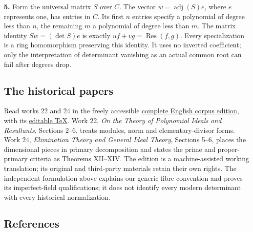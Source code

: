 \documentclass[
]{article}
\begin{document}
\textbf{5.} Form the universal matrix \(S\) over \(C\). The vector
\(w=\operatorname{adj}(S)e\), where \(e\) represents one, has entries in
\(C\). Its first \(n\) entries specify a polynomial of degree less than
\(n\), the remaining \(m\) a polynomial of degree less than \(m\). The
matrix identity \(Sw=(\det S)e\) is exactly
\(uf+vg=\operatorname{Res}(f,g)\). Every specialization is a ring
homomorphism preserving this identity. It uses no inverted coefficient;
only the interpretation of determinant vanishing as an actual common
root can fail after degrees drop.

\subsection{The historical papers}\label{the-historical-papers}

Read works 22 and 24 in the freely accessible
\href{https://zenodo.org/records/21923146/preview/00_EMMY_NOETHER_EN_COMPLETE_LINKED_READER.pdf?include_deleted=0}{complete
English corpus edition}, with its
\href{https://raw.githubusercontent.com/KokunoYumeto/emmy-noether-en/main/source/Noether_English_ED0014.tex}{editable
TeX}. Work 22, \emph{On the Theory of Polynomial Ideals and Resultants},
Sections 2--6, treats modules, norm and elementary-divisor forms. Work
24, \emph{Elimination Theory and General Ideal Theory}, Sections 5--6,
places the dimensional pieces in primary decomposition and states the
prime and proper-primary criteria as Theorems XII--XIV. The edition is a
machine-assisted working translation; its original and third-party
materials retain their own rights. The independent formulation above
explains our generic-fibre convention and proves its imperfect-field
qualifications; it does not identify every modern determinant with every
historical normalization.

\subsection{References}\label{references}
\end{document}
